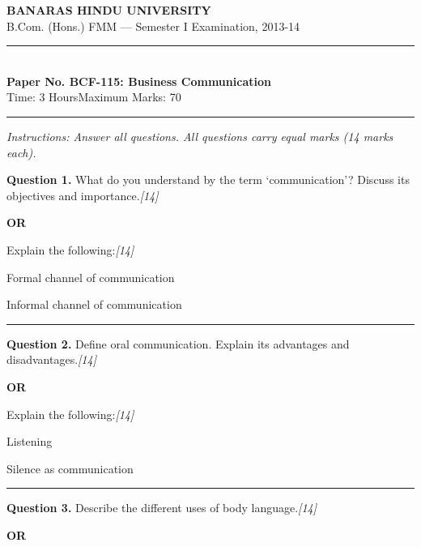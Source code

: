 \documentclass[11pt,a4paper]{article}
\newcommand{\pts}[1]{\hfill   \textit{[#1]}}
\begin{document}
\begin{center}
  {\large\bfseries BANARAS HINDU UNIVERSITY}\\[2pt]
  {\normalsize B.Com. (Hons.) FMM --- Semester I Examination, 2013-14}\\[6pt]
  \rule{0.8\linewidth}{0.5pt}\\[6pt]
  {\large\bfseries Paper No. BCF-115: Business Communication}\\[4pt]
  {\normalsize Time: 3 Hours\hfill Maximum Marks: 70}
\end{center}

\rule{\linewidth}{0.4pt}

\smallskip



\noindent   \textit{Instructions: Answer all questions. All questions carry equal marks (14 marks each).}

\bigskip




\noindent   \textbf{Question 1.}
What do you understand by the term `communication'? Discuss its objectives and importance.\pts{14}

\centerline{   \textbf{OR}}

Explain the following:\pts{14}

\begin{parts}
  \item Formal channel of communication
  \item Informal channel of communication
\end{parts}

\medskip\rule{\linewidth}{0.2pt}




\noindent   \textbf{Question 2.}
Define oral communication. Explain its advantages and disadvantages.\pts{14}

\centerline{   \textbf{OR}}

Explain the following:\pts{14}

\begin{parts}
  \item Listening
  \item Silence as communication
\end{parts}

\medskip\rule{\linewidth}{0.2pt}




\noindent   \textbf{Question 3.}
Describe the different uses of body language.\pts{14}

\centerline{   \textbf{OR}}
\end{document}

